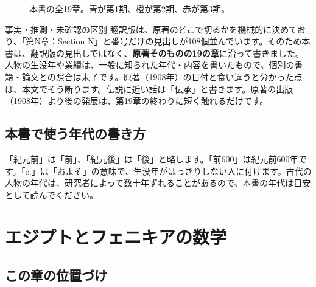 \documentclass[a4paper,11pt,openany]{ltjsbook}
\begin{document}
\begin{figure}[htbp]
\caption{本書の全19章。青が第1期、橙が第2期、赤が第3期。}
\end{figure}

\begin{notebox}{事実・推測・未確認の区別}
翻訳版は、原著のどこで切るかを機械的に決めており、「第N章：Section N」と番号だけの見出しが108個並んでいます。そのため本書は、翻訳版の見出しではなく、\textbf{原著そのものの19の章}に沿って書きました。人物の生没年や業績は、一般に知られた年代・内容を書いたもので、個別の書籍・論文との照合は未了です。原著（1908年）の日付と食い違うと分かった点は、本文でそう断ります。伝説に近い話は「伝承」と書きます。原著の出版（1908年）より後の発展は、第19章の終わりに短く触れるだけです。
\end{notebox}

\section*{本書で使う年代の書き方}

「紀元前」は「前」、「紀元後」は「後」と略します。「前600」は紀元前600年です。「c.」は「およそ」の意味で、生没年がはっきりしない人に付けます。古代の人物の年代は、研究者によって数十年ずれることがあるので、本書の年代は目安として読んでください。

\chapter{エジプトとフェニキアの数学}

\section{この章の位置づけ}
\end{document}
